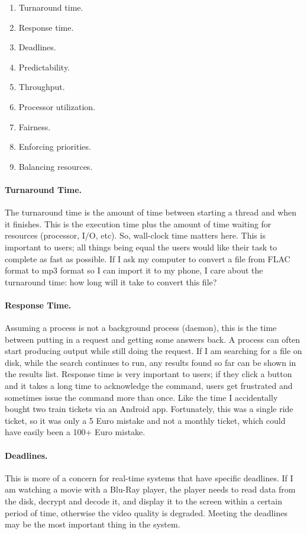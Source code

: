 \begin{enumerate}
	\item Turnaround time.
	\item Response time.
	\item Deadlines.
	\item Predictability.
	\item Throughput.
	\item Processor utilization.
	\item Fairness.
	\item Enforcing priorities.
	\item Balancing resources.
\end{enumerate}

\paragraph{Turnaround Time.} The turnaround time is the amount of time between starting a thread and when it finishes. This is the execution time plus the amount of time waiting for resources (processor, I/O, etc). So, wall-clock time matters here. This is important to users; all things being equal the users would like their task to complete as fast as possible. If I ask my computer to convert a file from FLAC format to mp3 format so I can import it to my phone, I care about the turnaround time: how long will it take to convert this file?

\paragraph{Response Time.} Assuming a process is not a background process (daemon), this is the time between putting in a request and getting some answers back. A process can often start producing output while still doing the request. If I am searching for a file on disk, while the search continues to run, any results found so far can be shown in the results list. Response time is very important to users; if they click a button and it takes a long time to acknowledge the command, users get frustrated and sometimes issue the command more than once. Like the time I accidentally bought two train tickets via an Android app. Fortunately, this was a single ride ticket, so it was only a 5 Euro mistake and not a monthly ticket, which could have easily been a 100+ Euro mistake.

\paragraph{Deadlines.} This is more of a concern for real-time systems that have specific deadlines. If I am watching a movie with a Blu-Ray player, the player needs to read data from the disk, decrypt and decode it, and display it to the screen within a certain period of time, otherwise the video quality is degraded. Meeting the deadlines may be the most important thing in the system.

